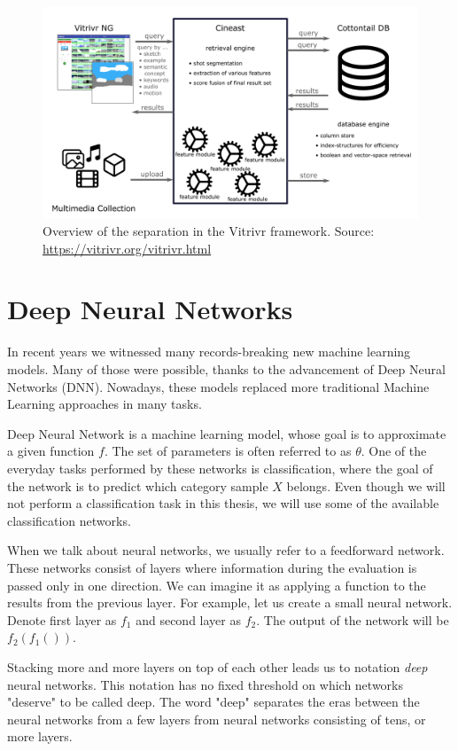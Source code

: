\begin{figure}
    \centering
    \includegraphics[width=\linewidth]{img/vitrivr.png}
    \caption{Overview of the separation in the Vitrivr framework. Source: \url{https://vitrivr.org/vitrivr.html}}
    \label{fig:vitrivr}
\end{figure}

\section{Deep Neural Networks}

In recent years we witnessed many records-breaking new machine learning models. Many of those were possible, thanks to the advancement of Deep Neural Networks (DNN). Nowadays, these models replaced more traditional Machine Learning approaches in many tasks.

Deep Neural Network is a machine learning model, whose goal is to approximate a given function \(f\). The set of parameters is often referred to as \(\theta\). One of the everyday tasks performed by these networks is classification, where the goal of the network is to predict which category sample \(X\) belongs. Even though we will not perform a classification task in this thesis, we will use some of the available classification networks.

When we talk about neural networks, we usually refer to a feedforward network. These networks consist of layers where information during the evaluation is passed only in one direction. We can imagine it as applying a function to the results from the previous layer. For example, let us create a small neural network. Denote first layer as \(f_1\) and second layer as \(f_2\). The output of the network will be \(f_2\left(f_1\left(\right)\right)\).

Stacking more and more layers on top of each other leads us to notation \emph{deep} neural networks. This notation has no fixed threshold on which networks "deserve" to be called deep. The word "deep" separates the eras between the neural networks from a few layers from neural networks consisting of tens, or more layers.  

